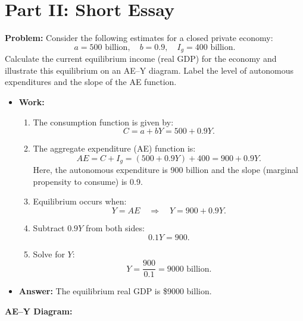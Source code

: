 \documentclass{article}
\begin{document}
\section*{Part II: Short Essay}

\textbf{Problem:} Consider the following estimates for a closed private economy:
\[
  a = 500 \text{ billion}, \quad b = 0.9, \quad I_g = 400 \text{ billion}.
\]
Calculate the current equilibrium income (real GDP) for the economy and illustrate this equilibrium on an AE--Y diagram. Label the level of autonomous expenditures and the slope of the AE function.

\begin{itemize}
  \item \textbf{Work:}
    \begin{enumerate}[label=\arabic*.]
      \item The consumption function is given by:
        \[
          C = a + bY = 500 + 0.9Y.
        \]
      \item The aggregate expenditure (AE) function is:
        \[
          AE = C + I_g = (500 + 0.9Y) + 400 = 900 + 0.9Y.
        \]
        Here, the autonomous expenditure is 900 billion and the slope (marginal propensity to consume) is 0.9.
      \item Equilibrium occurs when:
        \[
          Y = AE \quad \Longrightarrow \quad Y = 900 + 0.9Y.
        \]
      \item Subtract \(0.9Y\) from both sides:
        \[
          0.1Y = 900.
        \]
      \item Solve for \(Y\):
        \[
          Y = \frac{900}{0.1} = 9000 \text{ billion}.
        \]
    \end{enumerate}
  \item \textbf{Answer:} The equilibrium real GDP is \$9000 billion.
\end{itemize}

\textbf{AE--Y Diagram:}
\end{document}
